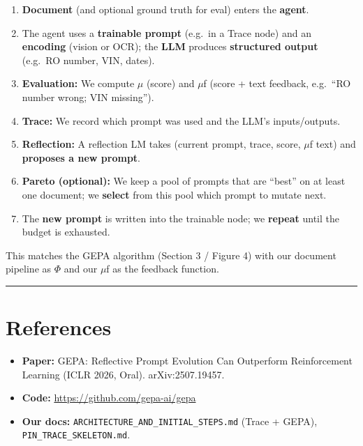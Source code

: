 \documentclass[11pt,a4paper]{article}
\begin{document}
\begin{enumerate}
  \item \textbf{Document} (and optional ground truth for eval) enters the \textbf{agent}.
  \item The agent uses a \textbf{trainable prompt} (e.g.\ in a Trace node) and an \textbf{encoding} (vision or OCR); the \textbf{LLM} produces \textbf{structured output} (e.g.\ RO number, VIN, dates).
  \item \textbf{Evaluation:} We compute $\mu$ (score) and $\mu$f (score + text feedback, e.g.\ ``RO number wrong; VIN missing'').
  \item \textbf{Trace:} We record which prompt was used and the LLM's inputs/outputs.
  \item \textbf{Reflection:} A reflection LM takes (current prompt, trace, score, $\mu$f text) and \textbf{proposes a new prompt}.
  \item \textbf{Pareto (optional):} We keep a pool of prompts that are ``best'' on at least one document; we \textbf{select} from this pool which prompt to mutate next.
  \item The \textbf{new prompt} is written into the trainable node; we \textbf{repeat} until the budget is exhausted.
\end{enumerate}

This matches the GEPA algorithm (Section 3 / Figure 4) with our document pipeline as $\Phi$ and our $\mu$f as the feedback function.

\vspace{1em}
\hrule
\vspace{0.5em}

\section{References}

\begin{itemize}
  \item \textbf{Paper:} GEPA: Reflective Prompt Evolution Can Outperform Reinforcement Learning (ICLR 2026, Oral). arXiv:2507.19457.
  \item \textbf{Code:} \url{https://github.com/gepa-ai/gepa}
  \item \textbf{Our docs:} \texttt{ARCHITECTURE\_AND\_INITIAL\_STEPS.md} (Trace + GEPA), \texttt{PIN\_TRACE\_SKELETON.md}.
\end{itemize}
\end{document}

